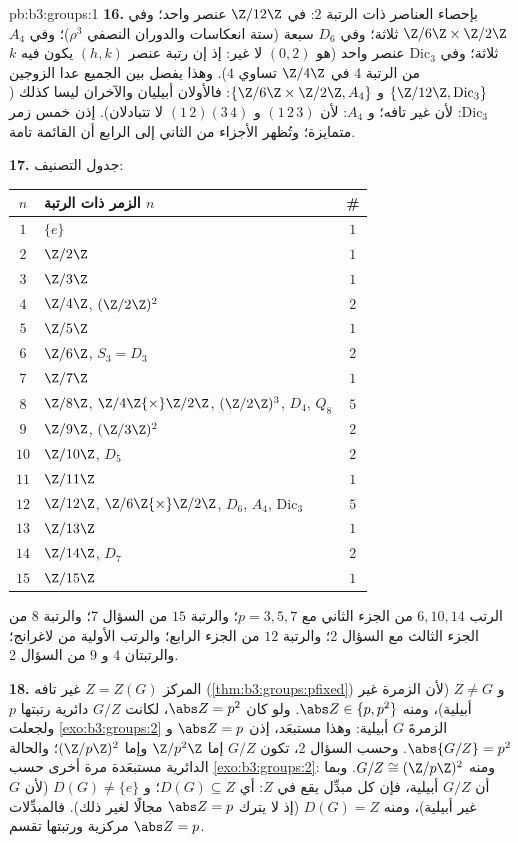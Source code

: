 \begin{solution}{pb:b3:groups:1}
\textbf{16.} بإحصاء العناصر ذات الرتبة $2$: في $\Z/12\Z$ عنصر
واحد؛ وفي $\Z/6\Z\times\Z/2\Z$ ثلاثة؛ وفي $D_6$ سبعة (ستة انعكاسات والدوران
النصفي $\rho^3$)؛ وفي $A_4$ ثلاثة؛ وفي $\mathrm{Dic}_3$ عنصر واحد
(هو $(0, 2)$ لا غير: إذ إن رتبة عنصر $(h, k)$ يكون فيه $k$ من
الرتبة $4$ في $\Z/4\Z$ تساوي $4$). وهذا يفصل بين الجميع عدا
الزوجين $\{\Z/12\Z, \mathrm{Dic}_3\}$ و $\{\Z/6\Z\times\Z/2\Z, A_4\}$: فالأولان أبيليان والآخران ليسا كذلك
($\mathrm{Dic}_3$: لأن  غير تافه؛ و $A_4$: لأن $(1\,2\,3)$
و $(1\,2)(3\,4)$ لا تتبادلان). إذن خمس زمر متمايزة؛ وتُظهر
الأجزاء من الثاني إلى الرابع أن القائمة تامة.

\textbf{17.} جدول التصنيف:
\begin{center}
\begin{tabular}{c l c}
$n$ & الزمر ذات الرتبة $n$ & \#\\
\hline
$1$ & $\{e\}$ & $1$\\
$2$ & $\Z/2\Z$ & $1$\\
$3$ & $\Z/3\Z$ & $1$\\
$4$ & $\Z/4\Z$, $(\Z/2\Z)^2$ & $2$\\
$5$ & $\Z/5\Z$ & $1$\\
$6$ & $\Z/6\Z$, $S_3 = D_3$ & $2$\\
$7$ & $\Z/7\Z$ & $1$\\
$8$ & $\Z/8\Z$, $\Z/4\Z{\times}\Z/2\Z$, $(\Z/2\Z)^3$, $D_4$,
      $Q_8$ & $5$\\
$9$ & $\Z/9\Z$, $(\Z/3\Z)^2$ & $2$\\
$10$ & $\Z/10\Z$, $D_5$ & $2$\\
$11$ & $\Z/11\Z$ & $1$\\
$12$ & $\Z/12\Z$, $\Z/6\Z{\times}\Z/2\Z$, $D_6$, $A_4$,
       $\mathrm{Dic}_3$ & $5$\\
$13$ & $\Z/13\Z$ & $1$\\
$14$ & $\Z/14\Z$, $D_7$ & $2$\\
$15$ & $\Z/15\Z$ & $1$\\
\end{tabular}
\end{center}
الرتب $6, 10, 14$ من الجزء الثاني مع $p = 3, 5, 7$؛ والرتبة $15$
من السؤال 7؛ والرتبة $8$ من الجزء الثالث مع السؤال 2؛ والرتبة
$12$ من الجزء الرابع؛ والرتب الأولية من لاغرانج؛ والرتبتان $4$
و $9$ من السؤال 2.

\textbf{18.} المركز $Z = Z(G)$ غير تافه (\cref{thm:b3:groups:pfixed}) و
$Z \neq G$ (لأن الزمرة غير أبيلية)، ومنه $\abs Z \in \{p, p^2\}$. ولو كان
$\abs Z = p^2$، لكانت $G/Z$ دائرية رتبتها $p$ ولجعلت
\cref{exo:b3:groups:2} الزمرةَ $G$ أبيلية: وهذا مستبعَد، إذن $\abs Z = p$
و $\abs{G/Z} = p^2$. وحسب السؤال 2، تكون $G/Z$ إما $\Z/p^2\Z$ وإما
$(\Z/p\Z)^2$؛ والحالة الدائرية مستبعَدة مرة أخرى حسب
\cref{exo:b3:groups:2}: ومنه $G/Z \cong (\Z/p\Z)^2$. وبما أن $G/Z$ أبيلية، فإن كل مبدِّل
يقع في $Z$: أي $D(G) \subseteq Z$؛ و $D(G) \neq \{e\}$ (لأن $G$ غير أبيلية)، ومنه
$D(G) = Z$ (إذ لا يترك $\abs Z = p$ مجالًا لغير ذلك). فالمبدِّلات
مركزية ورتبتها تقسم $\abs Z = p$.


\end{solution}
